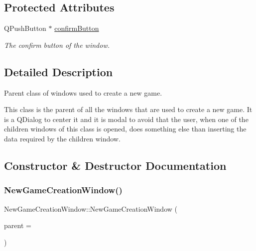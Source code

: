 \subsection*{Protected Attributes}
\begin{DoxyCompactItemize}
\item 
\mbox{\label{classNewGameCreationWindow_a8d0d915f4fb0df24683813e33442219b}} 
Q\+Push\+Button $\ast$ \hyperlink{classNewGameCreationWindow_a8d0d915f4fb0df24683813e33442219b}{confirm\+Button}
\begin{DoxyCompactList}\small\item\em The confirm button of the window. \end{DoxyCompactList}\end{DoxyCompactItemize}


\subsection{Detailed Description}
Parent class of windows used to create a new game. 

This class is the parent of all the windows that are used to create a new game. It is a Q\+Dialog to center it and it is modal to avoid that the user, when one of the children windows of this class is opened, does something else than inserting the data required by the children window. 

\subsection{Constructor \& Destructor Documentation}
\mbox{\label{classNewGameCreationWindow_a1b8cd9166289a086a951c2ee9d6bfebe}} 
\subsubsection{\texorpdfstring{New\+Game\+Creation\+Window()}{NewGameCreationWindow()}}
{\footnotesize\ttfamily New\+Game\+Creation\+Window\+::\+New\+Game\+Creation\+Window (\begin{DoxyParamCaption}\item[{Q\+Widget $\ast$}]{parent = {} }\end{DoxyParamCaption})}



